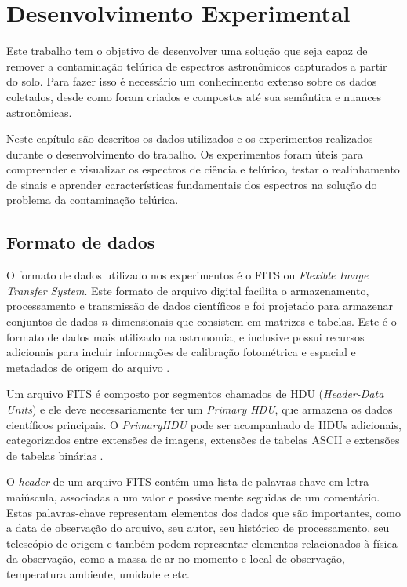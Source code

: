 \chapter{Desenvolvimento Experimental}
\label{cap:desenvolvimentos}

Este trabalho tem o objetivo de desenvolver uma solução que seja capaz de remover a contaminação telúrica de espectros astronômicos capturados a partir do solo. Para fazer isso é necessário um conhecimento extenso sobre os dados coletados, desde como foram criados e compostos até sua semântica e nuances astronômicas.  

Neste capítulo são descritos os dados utilizados e os experimentos realizados durante o desenvolvimento do trabalho. Os experimentos foram úteis para compreender e visualizar os espectros de ciência e telúrico, testar o realinhamento de sinais e aprender características fundamentais dos espectros na solução do problema da contaminação telúrica.  

\section{Formato de dados}

O formato de dados utilizado nos experimentos é o FITS ou \textit{Flexible Image Transfer System}. Este formato de arquivo digital facilita o armazenamento, processamento e transmissão de dados científicos e foi projetado para armazenar conjuntos de dados $n$-dimensionais que consistem em matrizes e tabelas. Este é o formato de dados mais utilizado na astronomia, e inclusive possui recursos adicionais para incluir informações de calibração fotométrica e espacial e metadados de origem do arquivo \citep{pence2010definition}.

Um arquivo FITS é composto por segmentos chamados de HDU (\textit{Header-Data Units}) e ele deve necessariamente ter um \textit{Primary HDU}, que armazena os dados científicos principais. O \textit{PrimaryHDU} pode ser acompanhado de HDUs adicionais, categorizados entre extensões de imagens, extensões de tabelas ASCII e extensões de tabelas binárias \citep{nasa-fits}.

O \textit{header} de um arquivo FITS contém uma lista de palavras-chave em letra maiúscula, associadas a um valor e possivelmente seguidas de um comentário. Estas palavras-chave representam elementos dos dados que são importantes, como a data de observação do arquivo, seu autor, seu histórico de processamento, seu telescópio de origem e também podem representar elementos relacionados à física da observação, como a massa de ar no momento e local de observação, temperatura ambiente, umidade e etc.


